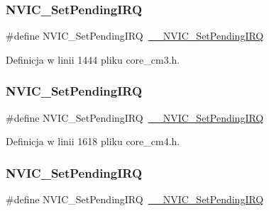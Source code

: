 \subsubsection{\texorpdfstring{N\+V\+I\+C\+\_\+\+Set\+Pending\+I\+RQ}{NVIC\_SetPendingIRQ}\hspace{0.1cm}{\footnotesize\ttfamily [8/12]}}
{\footnotesize\ttfamily \#define N\+V\+I\+C\+\_\+\+Set\+Pending\+I\+RQ~\hyperlink{group___c_m_s_i_s___core___n_v_i_c_functions_gaabefdd4b790b9a7308929938c0c1e1ad}{\+\_\+\+\_\+\+N\+V\+I\+C\+\_\+\+Set\+Pending\+I\+RQ}}



Definicja w linii 1444 pliku core\+\_\+cm3.\+h.

\mbox{\label{group___c_m_s_i_s___core___n_v_i_c_functions_ga2b47e2e52cf5c48a5c3348636434b3ac}} 
\subsubsection{\texorpdfstring{N\+V\+I\+C\+\_\+\+Set\+Pending\+I\+RQ}{NVIC\_SetPendingIRQ}\hspace{0.1cm}{\footnotesize\ttfamily [9/12]}}
{\footnotesize\ttfamily \#define N\+V\+I\+C\+\_\+\+Set\+Pending\+I\+RQ~\hyperlink{group___c_m_s_i_s___core___n_v_i_c_functions_gaabefdd4b790b9a7308929938c0c1e1ad}{\+\_\+\+\_\+\+N\+V\+I\+C\+\_\+\+Set\+Pending\+I\+RQ}}



Definicja w linii 1618 pliku core\+\_\+cm4.\+h.

\mbox{\label{group___c_m_s_i_s___core___n_v_i_c_functions_ga2b47e2e52cf5c48a5c3348636434b3ac}} 
\subsubsection{\texorpdfstring{N\+V\+I\+C\+\_\+\+Set\+Pending\+I\+RQ}{NVIC\_SetPendingIRQ}\hspace{0.1cm}{\footnotesize\ttfamily [10/12]}}
{\footnotesize\ttfamily \#define N\+V\+I\+C\+\_\+\+Set\+Pending\+I\+RQ~\hyperlink{group___c_m_s_i_s___core___n_v_i_c_functions_gaabefdd4b790b9a7308929938c0c1e1ad}{\+\_\+\+\_\+\+N\+V\+I\+C\+\_\+\+Set\+Pending\+I\+RQ}}



